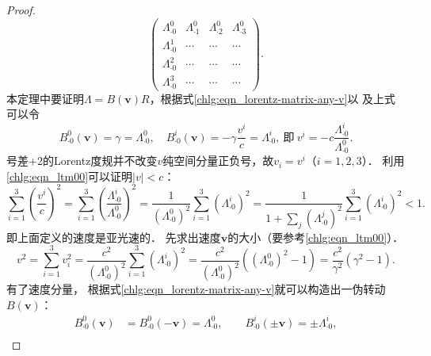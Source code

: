 \begin{proof}
\begin{equation}
\begin{pmatrix}
            \Lambda^0_{\cdot 0} & \Lambda^0_{\cdot 1} & \Lambda^0_{\cdot 2}& \Lambda^0_{\cdot 3}\\
            \Lambda^1_{\cdot 0} & \cdots & \cdots& \cdots\\
            \Lambda^2_{\cdot 0} & \cdots & \cdots& \cdots\\
            \Lambda^3_{\cdot 0} & \cdots & \cdots& \cdots
        \end{pmatrix} .
    \end{equation}
    本定理中要证明$\Lambda=B(\boldsymbol{v})R$，根据式\eqref{chlg:eqn_lorentz-matrix-any-v}以
    及上式可以令
    \begin{equation}
        B^{0}_{\cdot 0}(\boldsymbol{v})=\gamma = \Lambda^0_{\cdot 0}, \quad
        B^{i}_{\cdot 0}(\boldsymbol{v})=-\gamma\frac{v^i}{c}= {\Lambda^i_{\cdot 0}}, \ \text{即}\
        {v^i}= - {c}\frac{\Lambda^i_{\cdot 0}}{\Lambda^0_{\cdot 0}}.
    \end{equation}
    号差$+2$的Lorentz度规并不改变$v$纯空间分量正负号，故$v_i=v^i$（$i=1,2,3$）．
    利用\eqref{chlg:eqn_ltm00}可以证明$|v|<c$：
    \begin{equation*}
        \sum_{i=1}^{3}\left( \frac{v^i}{c}\right)^2
        =\sum_{i=1}^{3}\left( \frac{\Lambda^i_{\cdot 0}}{\Lambda^0_{\cdot 0}}\right)^2
        =\frac{1}{(\Lambda^0_{\cdot 0})^2} \sum_{i=1}^{3}\left( {\Lambda^i_{\cdot 0}}\right)^2
        =\frac{1}{1+\sum_{j}\left( {\Lambda^j_{\cdot 0}}\right)^2}
        \sum_{i=1}^{3}\left( {\Lambda^i_{\cdot 0}}\right)^2    <1  .
    \end{equation*}
    即上面定义的速度是亚光速的．
    先求出速度$\boldsymbol{v}$的大小（要参考\eqref{chlg:eqn_ltm00}）．
    \setlength{\mathindent}{0em}
    \begin{equation}\label{chlg:eqn_ltdbr-v}
        v^2 = \sum_{i=1}^{3}v_i^2 =  \dfrac{c^2}{(\Lambda^0_{\cdot 0})^2} \sum_{i=1}^{3}
        ({\Lambda^i_{\cdot 0}})^2
        = \dfrac{c^2}{(\Lambda^0_{\cdot 0})^2}\left(  (\Lambda^0_{\cdot 0})^2 -1\right)
        = \dfrac{c^2}{\gamma^2}\left(  \gamma^2 -1\right).
    \end{equation}\setlength{\mathindent}{2em}
    有了速度分量，
    根据式\eqref{chlg:eqn_lorentz-matrix-any-v}就可以构造出一伪转动$B(\boldsymbol{v})$：
    \begin{equation}\label{chlg:eqn_ltdbr-b}
        \begin{aligned}
            B^{0}_{\cdot 0}(\boldsymbol{v}) &= B^{0}_{\cdot 0}(-\boldsymbol{v}) =  \Lambda ^{0}_{\cdot 0}, \qquad
            B^{i}_{\cdot 0}(\pm\boldsymbol{v}) = \pm \Lambda ^{i}_{\cdot 0}, \\

\end{aligned}
\end{equation}
\end{proof}
